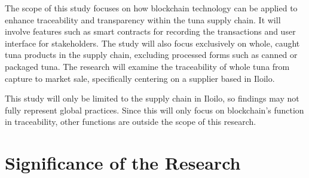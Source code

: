 The scope of this study focuses on how blockchain technology can be applied to enhance traceability and transparency within the tuna supply chain. It will involve features such as smart contracts for recording the transactions and user interface for stakeholders. The study will also focus exclusively on whole, caught tuna products in the supply chain, excluding processed forms such as canned or packaged tuna. The research will examine the traceability of whole tuna from capture to market sale, specifically centering on a supplier based in Iloilo. 

\noindent This study will only be limited to the supply chain in Iloilo, so findings may not fully represent global practices. Since this will only focus on blockchain’s function in traceability, other functions are outside the scope of this research. 


\begin{comment}

%
%
Generally, one paragraph should be allotted for each of your research objectives.

Each paragraph contains a brief overview of the concept/theory and the purpose of doing the associated objective.

Each paragraph also includes a description of the scope/limitation of your study.

* Please refer to the slides for examples.

\end{comment}


\section{Significance of the Research}
\label{sec:significance}


